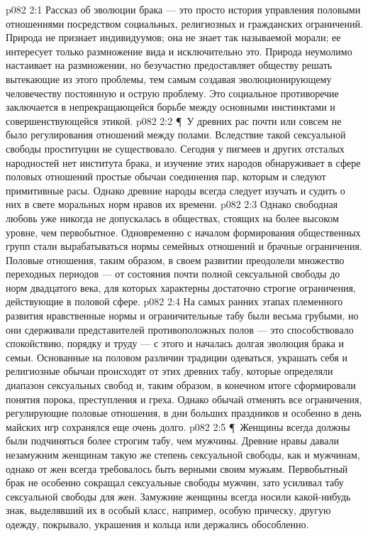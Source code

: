 \vs p082 2:1 Рассказ об эволюции брака --- это просто история управления половыми отношениями посредством социальных, религиозных и гражданских ограничений. Природа не признает индивидуумов; она не знает так называемой морали; ее интересует только размножение вида и исключительно это. Природа неумолимо настаивает на размножении, но безучастно предоставляет обществу решать вытекающие из этого проблемы, тем самым создавая эволюционирующему человечеству постоянную и острую проблему. Это социальное противоречие заключается в непрекращающейся борьбе между основными инстинктами и совершенствующейся этикой.
\vs p082 2:2 \P\ У древних рас почти или совсем не было регулирования отношений между полами. Вследствие такой сексуальной свободы проституции не существовало. Сегодня у пигмеев и других отсталых народностей нет института брака, и изучение этих народов обнаруживает в сфере половых отношений простые обычаи соединения пар, которым и следуют примитивные расы. Однако древние народы всегда следует изучать и судить о них в свете моральных норм нравов их времени.
\vs p082 2:3 Однако свободная любовь уже никогда не допускалась в обществах, стоящих на более высоком уровне, чем первобытное. Одновременно с началом формирования общественных групп стали вырабатываться нормы семейных отношений и брачные ограничения. Половые отношения, таким образом, в своем развитии преодолели множество переходных периодов --- от состояния почти полной сексуальной свободы до норм двадцатого века, для которых характерны достаточно строгие ограничения, действующие в половой сфере.
\vs p082 2:4 На самых ранних этапах племенного развития нравственные нормы и ограничительные табу были весьма грубыми, но они сдерживали представителей противоположных полов --- это способствовало спокойствию, порядку и труду --- с этого и началась долгая эволюция брака и семьи. Основанные на половом различии традиции одеваться, украшать себя и религиозные обычаи происходят от этих древних табу, которые определяли диапазон сексуальных свобод и, таким образом, в конечном итоге сформировали понятия порока, преступления и греха. Однако обычай отменять все ограничения, регулирующие половые отношения, в дни больших праздников и особенно в день майских игр сохранялся еще очень долго.
\vs p082 2:5 \P\ Женщины всегда должны были подчиняться более строгим табу, чем мужчины. Древние нравы давали незамужним женщинам такую же степень сексуальной свободы, как и мужчинам, однако от жен всегда требовалось быть верными своим мужьям. Первобытный брак не особенно сокращал сексуальные свободы мужчин, зато усиливал табу сексуальной свободы для жен. Замужние женщины всегда носили какой\hyp{}нибудь знак, выделявший их в особый класс, например, особую прическу, другую одежду, покрывало, украшения и кольца или держались обособленно.
